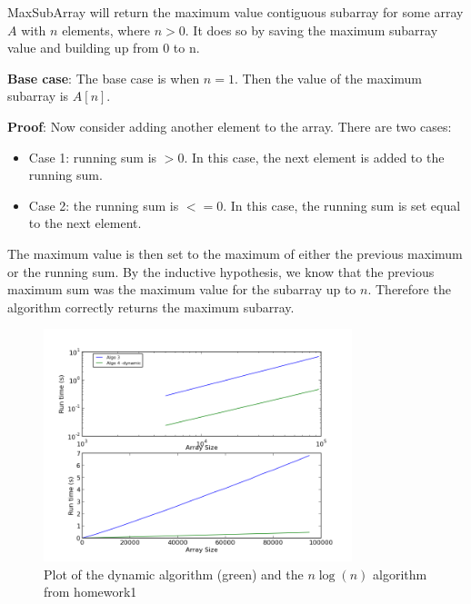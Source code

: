 \documentclass[a4paper,12pt]{article}
\begin{document}
MaxSubArray will return the maximum value contiguous subarray for some array $A$ with $n$ elements, where $n>0$. It does so by saving the maximum subarray value and building up from 0 to n. 

\textbf{Base case}: The base case is when $n=1$. Then the value of the maximum subarray is $A[n]$.

\textbf{Proof}: Now consider adding another element to the array. There are two cases:

\begin{itemize}


\item Case 1: running sum is $> 0$. In this case, the next element is added to the running sum.

\item Case 2: the running sum is $<= 0$. In this case, the running sum is set equal to the next element. 

\end{itemize}

The maximum value is then set to the maximum of either the previous maximum or the running sum. By the inductive hypothesis, we know that the previous maximum sum was the maximum value for the subarray up to $n$. Therefore the algorithm correctly returns the maximum subarray.


\pagebreak
 
\begin{figure}[h!]
\centering
\includegraphics[width=0.8\textwidth]{algo4runtime}
\caption{Plot of the dynamic algorithm (green) and the $n\log(n)$ algorithm from homework1}
\end{figure} 
\end{document}
